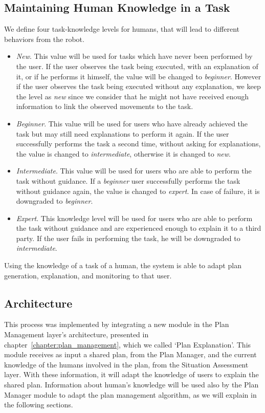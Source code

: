 \subsection{Maintaining Human Knowledge in a Task}
We define four task-knowledge levels for humans, that will lead to different behaviors from the robot.

\begin{itemize}
\item \textit{New}. This value will be used for tasks which have never been performed by the user. If the user observes the task being executed, with an explanation of it, or if he performs it himself, the value will be changed to \textit{beginner}. However if the user observes the task being executed without any explanation, we keep the level as \textit{new} since we consider that he might not have received enough information to link the observed movements to the task.
\item \textit{Beginner}. This value will be used for users who have already achieved the task but may still need explanations to perform it again. If the user successfully performs the task a second time, without asking for explanations, the value is changed to \textit{intermediate}, otherwise it is changed to \textit{new}.
\item \textit{Intermediate}. This value will be used for users who are able to perform the task without guidance. If a \textit{beginner} user successfully performs the task without guidance again, the value is changed to \textit{expert}. In case of failure, it is downgraded to \textit{beginner}.
\item \textit{Expert}. This knowledge level will be used for users who are able to perform the task without guidance and are experienced enough to explain it to a third party. If the user fails in performing the task, he will be downgraded to \textit{intermediate}.
\end{itemize}

Using the knowledge of a task of a human, the system is able to adapt plan generation, explanation, and monitoring to that user.


\subsection{Architecture}
This process was implemented by integrating a new module in the Plan Management layer's architecture, presented in chapter~\ref{chapter:plan_management}, which we called `Plan Explanation'. This module receives as input a shared plan, from the Plan Manager, and the current knowledge of the humans involved in the plan, from the Situation Assessment layer. With these information, it will adapt the knowledge of users to explain the shared plan. Information about human's knowledge will be used also by the Plan Manager module to adapt the plan management algorithm, as we will explain in the following sections.

